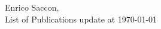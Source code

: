 \documentclass[10pt,a4paper,sans]{article}
\begin{document}
\pagestyle{empty}

\begin{center}
  \Large{Enrico Saccon,}\\
  \Large{List of Publications update at \today}
\end{center}

\nocite{*}
\printbibliography[heading=none]
\end{document}
